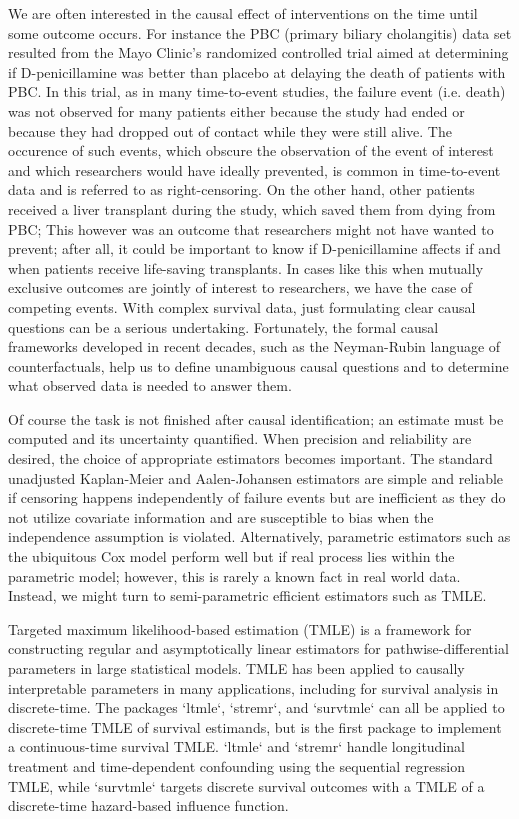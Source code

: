 \documentclass{report}
\newcommand{\1}{\ensuremath{\mathbf{1}}}
\begin{document}
We are often interested in the causal effect of interventions on the time until some outcome occurs. For instance the PBC (primary biliary cholangitis) data set resulted from the Mayo Clinic's randomized controlled trial aimed at determining if D-penicillamine was better than placebo at delaying the death of patients with PBC. In this trial, as in many time-to-event studies, the failure event (i.e. death) was not observed for many patients either because the study had ended or because they had dropped out of contact while they were still alive. The occurence of such events, which obscure the observation of the event of interest and which researchers would have ideally prevented, is common in time-to-event data and is referred to as right-censoring. On the other hand, other patients received a liver transplant during the study, which saved them from dying from PBC; This however was an outcome that researchers might not have wanted to prevent; after all, it could be important to know if D-penicillamine affects if and when patients receive life-saving transplants. In cases like this when mutually exclusive outcomes are jointly of interest to researchers, we have the case of competing events. With complex survival data, just formulating clear causal questions can be a serious undertaking. Fortunately, the formal causal frameworks developed in recent decades, such as the Neyman-Rubin language of counterfactuals, help us to define unambiguous causal questions and to determine what observed data is needed to answer them. 

Of course the task is not finished after causal identification; an estimate must be computed and its uncertainty quantified. When precision and reliability are desired, the choice of appropriate estimators becomes important. The standard unadjusted Kaplan-Meier and Aalen-Johansen estimators are simple and reliable if censoring happens independently of failure events but are inefficient as they do not utilize covariate information and are susceptible to bias when the independence assumption is violated. Alternatively, parametric estimators such as the ubiquitous Cox model perform well but if real process lies within the parametric model; however, this is rarely a known fact in real world data. Instead, we might turn to semi-parametric efficient estimators such as TMLE.

Targeted maximum likelihood-based estimation (TMLE) is a framework for constructing regular and asymptotically linear estimators for pathwise-differential parameters in large statistical models. TMLE has been applied to causally interpretable parameters in many applications, including for survival analysis in discrete-time. The packages `ltmle`, `stremr`, and `survtmle` can all be applied to discrete-time TMLE of survival estimands, but  is the first package to implement a continuous-time survival TMLE. `ltmle` and `stremr` handle longitudinal treatment and time-dependent confounding using the sequential regression TMLE, while `survtmle` targets discrete survival outcomes with a TMLE of a discrete-time hazard-based influence function.
\end{document}
